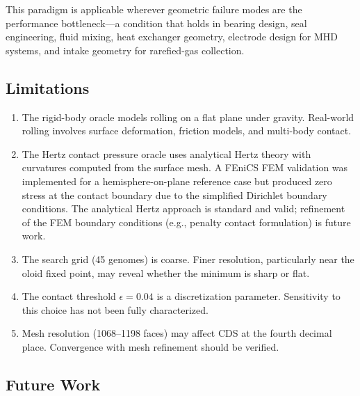\documentclass[11pt,a4paper]{article}
\begin{document}
This paradigm is applicable wherever geometric failure modes are the
performance bottleneck---a condition that holds in bearing design,
seal engineering, fluid mixing, heat exchanger geometry, electrode
design for MHD systems, and intake geometry for rarefied-gas
collection.

\subsection{Limitations}

\begin{enumerate}[leftmargin=*]
  \item The rigid-body oracle models rolling on a flat plane under
    gravity. Real-world rolling involves surface deformation, friction
    models, and multi-body contact.
  \item The Hertz contact pressure oracle uses analytical Hertz theory
    with curvatures computed from the surface mesh. A FEniCS FEM
    validation was implemented for a hemisphere-on-plane reference case
    but produced zero stress at the contact boundary due to the
    simplified Dirichlet boundary conditions. The analytical Hertz
    approach is standard and valid; refinement of the FEM boundary
    conditions (e.g., penalty contact formulation) is future work.
  \item The search grid (45 genomes) is coarse. Finer resolution,
    particularly near the oloid fixed point, may reveal whether the
    minimum is sharp or flat.
  \item The contact threshold $\epsilon = 0.04$ is a discretization
    parameter. Sensitivity to this choice has not been fully
    characterized.
  \item Mesh resolution (1068--1198 faces) may affect CDS at the
    fourth decimal place. Convergence with mesh refinement should
    be verified.
\end{enumerate}

\subsection{Future Work}
\end{document}
